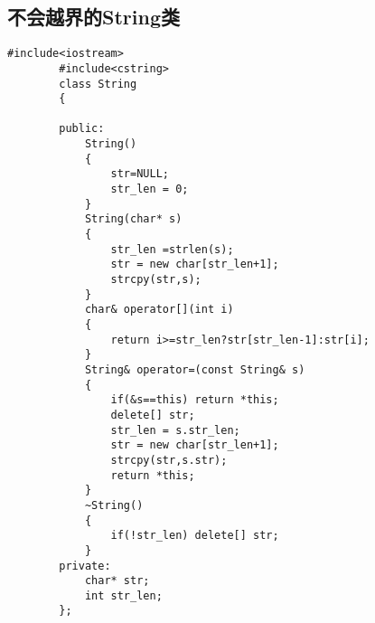 \documentclass[UTF8]{ctexart}
\begin{document}
\subsection{不会越界的String类}
    \begin{lstlisting}[language={[ANSI]C++}]
        #include<iostream>
        #include<cstring>
        class String
        {
        
        public:
            String()
            {
                str=NULL;
                str_len = 0;
            }
            String(char* s)
            {
                str_len =strlen(s); 
                str = new char[str_len+1];
                strcpy(str,s);
            }
            char& operator[](int i)
            {
                return i>=str_len?str[str_len-1]:str[i];   
            }
            String& operator=(const String& s)
            {
                if(&s==this) return *this;
                delete[] str;
                str_len = s.str_len;
                str = new char[str_len+1];
                strcpy(str,s.str);
                return *this;
            }
            ~String()
            {
                if(!str_len) delete[] str;
            }
        private:
            char* str;
            int str_len;
        };
\end{lstlisting}
\end{document}
